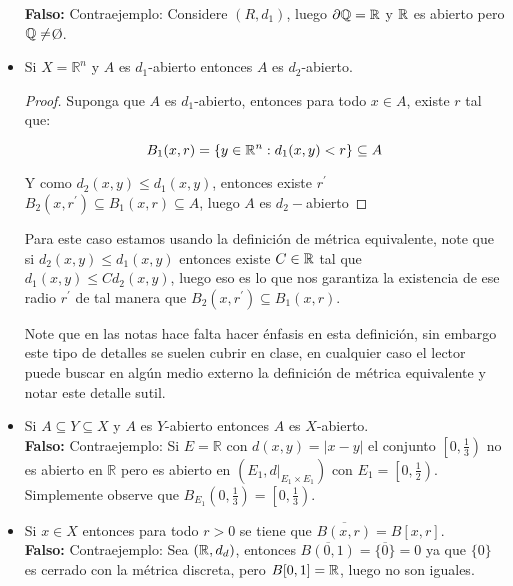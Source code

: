 \begin{itemize}[label={☠}]
\textbf{Falso:} Contraejemplo: Considere $(R,d_1)$, luego $\partial \mathbb{Q}=\mathbb{R}$ y $\mathbb{R}$ es abierto pero $\mathbb{Q}\neq$\O.



\item Si $X=\mathbb{R}^n$ y $A$ es $d_1$-abierto entonces $A$ es $d_2$-abierto.\\

\begin{proof}
Suponga que $A$ es $d_1$-abierto, entonces para todo $x\in A$, existe $r$ tal que:
 
$$B_1(x,r)=\{y\in \mathbb{R}^{n} : d_1(x,y)<r\}\subseteq A$$

Y como $d_2(x,y)\leq d_1(x,y)$, entonces existe $r^{\prime}$ $B_2(x,r^{\prime})\subseteq B_1(x,r)\subseteq A$, luego $A$ es $d_2-$abierto

\end{proof}

\begin{note}
Para este caso estamos usando la definición de métrica equivalente, note que si $d_2(x,y)\leq d_1(x,y)$ entonces existe $C\in \mathbb{R}$ tal que $d_1(x,y)\leq C d_2(x,y)$, luego eso es lo que nos garantiza la existencia de ese radio $r^{\prime}$ de tal manera que $B_2(x,r^{\prime})\subseteq B_1(x,r)$. 
\end{note}

\begin{note}
Note que en las notas hace falta hacer énfasis en esta definición, sin embargo este tipo de detalles se suelen cubrir en clase, en cualquier caso el lector puede buscar en algún medio externo la definición de métrica equivalente y notar este detalle sutil.
\end{note}



\item Si $A \subseteq Y \subseteq X$ y $A$ es $Y$-abierto entonces $A$ es $X$-abierto.\\

\textbf{Falso: } Contraejemplo: Si $E=\mathbb{R}$ con $d(x, y)=|x-y|$ el conjunto $\left[0, \frac{1}{3}\right)$ no es abierto en $\mathbb{R}$ pero es abierto en $\left(E_1,\left.d\right|_{E_1 \times E_1}\right)$ con $E_1=\left[0, \frac{1}{2}\right)$. Simplemente observe que $B_{E_1}\left(0, \frac{1}{3}\right)=\left[0, \frac{1}{3}\right)$.

\item Si $x \in X$ entonces para todo $r>0$ se tiene que $\overline{B(x, r)}=B[x, r]$.\\

\textbf{Falso:} Contraejemplo: Sea $(\mathbb{R},d_d)$, entonces $\overline{B(0,1)}=\overline{\{0\}}=0$ ya que $\{0\}$ es cerrado con la métrica discreta, pero $B[0,1]=\mathbb{R}$, luego no son iguales.

\end{itemize}

